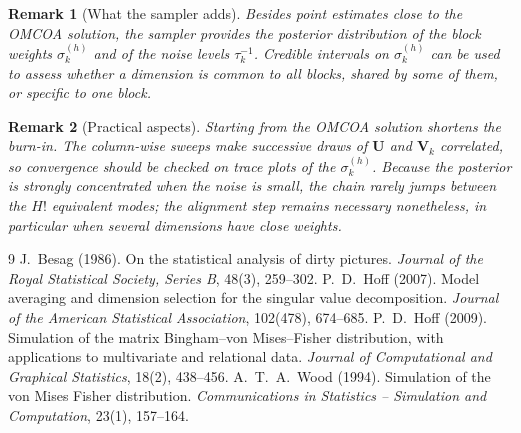 \documentclass[11pt]{article}
\newtheorem{remark}{Remark}
\newcommand{\U}{\mathbf{U}}
\newcommand{\V}{\mathbf{V}}
\begin{document}
\begin{remark}[What the sampler adds]
Besides point estimates close to the OMCOA solution, the sampler provides the posterior distribution of the block
weights $\sigma_k^{(h)}$ and of the noise levels $\tau_k^{-1}$. Credible intervals on $\sigma_k^{(h)}$ can be used to assess
whether a dimension is common to all blocks, shared by some of them, or specific to one block.
\end{remark}

\begin{remark}[Practical aspects]
Starting from the OMCOA solution shortens the burn-in. The column-wise sweeps make successive draws of $\U$ and
$\V_k$ correlated, so convergence should be checked on trace plots of the $\sigma_k^{(h)}$. Because the posterior is
strongly concentrated when the noise is small, the chain rarely jumps between the $H!$ equivalent modes; the alignment step
remains necessary nonetheless, in particular when several dimensions have close weights.
\end{remark}

\begin{thebibliography}{9}
 J.~Besag (1986). On the statistical analysis of dirty pictures.
  \emph{Journal of the Royal Statistical Society, Series B}, 48(3), 259--302.
 P.~D.~Hoff (2007). Model averaging and dimension selection for the singular value decomposition.
  \emph{Journal of the American Statistical Association}, 102(478), 674--685.
 P.~D.~Hoff (2009). Simulation of the matrix Bingham--von Mises--Fisher distribution, with
  applications to multivariate and relational data. \emph{Journal of Computational and Graphical Statistics}, 18(2), 438--456.
 A.~T.~A.~Wood (1994). Simulation of the von Mises Fisher distribution.
  \emph{Communications in Statistics -- Simulation and Computation}, 23(1), 157--164.
\end{thebibliography}
\end{document}
